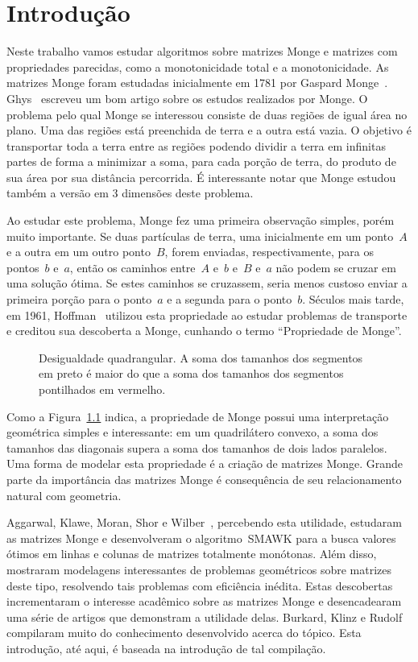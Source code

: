 \chapter{Introdução}
\label{Introducao}

Neste trabalho vamos estudar algoritmos sobre matrizes Monge e matrizes com propriedades parecidas, como a monotonicidade total e a monotonicidade. As matrizes Monge foram estudadas inicialmente em 1781 por Gaspard Monge~\cite{Monge:1781}. Ghys~\cite{Ghys:2012} escreveu um bom artigo sobre os estudos realizados por Monge. O problema pelo qual Monge se interessou consiste de duas regiões de igual área no plano. Uma das regiões está preenchida de terra e a outra está vazia. O objetivo é transportar toda a terra entre as regiões podendo dividir a terra em infinitas partes de forma a minimizar a soma, para cada porção de terra, do produto de sua área por sua distância percorrida. É interessante notar que Monge estudou também a versão em 3 dimensões deste problema.

Ao estudar este problema, Monge fez uma primeira observação simples, porém muito importante. Se duas partículas de terra, uma inicialmente em um ponto~$A$ e a outra em um outro ponto~$B$, forem enviadas, respectivamente, para os pontos~$b$ e~$a$, então os caminhos entre~$A$ e~$b$ e~$B$ e~$a$ não podem se cruzar em uma solução ótima. Se estes caminhos se cruzassem, seria menos custoso enviar a primeira porção para o ponto~$a$ e a segunda para o ponto~$b$. Séculos mais tarde, em 1961, Hoffman~\cite{Hoffman:2003} utilizou esta propriedade ao estudar problemas de transporte e creditou sua descoberta a Monge, cunhando o termo ``Propriedade de Monge''.

\begin{figure}[h]
    \centering
    
    \caption{Desigualdade quadrangular. A soma dos tamanhos dos segmentos em preto é maior do que a soma dos tamanhos dos segmentos pontilhados em vermelho.} \label{Introducao:QI}
\end{figure}

Como a Figura~\ref{Introducao:QI} indica, a propriedade de Monge possui uma interpretação geométrica simples e interessante: em um quadrilátero convexo, a soma dos tamanhos das diagonais supera a soma dos tamanhos de dois lados paralelos. Uma forma de modelar esta propriedade é a criação de matrizes Monge. Grande parte da importância das matrizes Monge é consequência de seu relacionamento natural com geometria. 

Aggarwal, Klawe, Moran, Shor e Wilber~\cite{Aggarwal:1987}, percebendo esta utilidade, estudaram as matrizes Monge e desenvolveram o algoritmo~\textsc{SMAWK} para a busca valores ótimos em linhas e colunas de matrizes totalmente monótonas. Além disso, mostraram modelagens interessantes de problemas geométricos sobre matrizes deste tipo, resolvendo tais problemas com eficiência inédita. Estas descobertas incrementaram o interesse acadêmico sobre as matrizes Monge e desencadearam uma série de artigos que demonstram a utilidade delas. Burkard, Klinz e Rudolf~\cite{Burkard:1996} compilaram muito do conhecimento desenvolvido acerca do tópico. Esta introdução, até aqui, é baseada na introdução de tal compilação.

